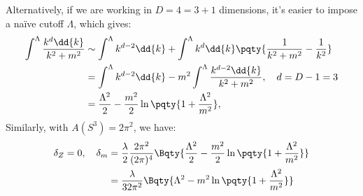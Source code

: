 \documentclass[a4paper
	,10pt
]{article}
\begin{document}
\begin{enumerate}
	Alternatively, if we are working in $D = 4 = 3 + 1$ dimensions, it's easier to impose a naïve cutoff $\Lambda$, which gives:
	\begin{equation}
	\begin{aligned}
		\int^\Lambda \frac{k^d \dd{k}}{k^2 + m^2}
		&\sim \int^\Lambda k^{d-2} \dd{k}
			+ \int^\Lambda k^d \dd{k}
				\pqty{
					\frac{1}{k^2 + m^2}
					- \frac{1}{k^2}
				} \\
		&= \int^\Lambda k^{d-2} \dd{k}
			- m^2 \int^\Lambda 
				\frac{k^{d-2} \dd{k}}{k^2 + m^2},
		\quad d = D - 1 = 3 \\
		&= \frac{\Lambda^2}{2}
			- \frac{m^2}{2} \ln \pqty{
				1 + \frac{\Lambda^2}{m^2}
			},
	\end{aligned}
	\end{equation}
	Similarly, with $A(S^3) = 2\pi^2$, we have:
	\begin{equation}
	\begin{aligned}
		\delta_Z = 0,
	\quad
		\delta_m
		&= \frac{\lambda}{2}
			\frac{2\pi^2}{(2\pi)^4} \Bqty{
				\frac{\Lambda^2}{2}
				- \frac{m^2}{2} \ln \pqty{
					1 + \frac{\Lambda^2}{m^2}
				}
			} \\
		&= \frac{\lambda}{32\pi^2} \Bqty{
				\Lambda^2
				- m^2 \ln \pqty{
					1 + \frac{\Lambda^2}{m^2}
				}
			}
	\end{aligned}
	\end{equation}
	
\end{enumerate}
\printbibliography
\end{document}
